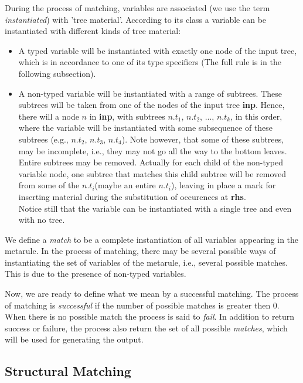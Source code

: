 During the process of matching, variables are associated 
(we use the term {\it instantiated}) with 'tree material'.
According to its class a variable can be instantiated with different kinds of
tree material:

\begin{itemize}
\item	A typed variable will be instantiated with exactly one node of
	the input tree, which is in accordance to one of its type specifiers
	(The full rule is in the following subsection). 

\item	A non-typed variable will be instantiated with a range of subtrees.
	These subtrees will be taken from one of the nodes of the input tree
	{\bf inp}. Hence, there will a node $n$ in {\bf inp}, with subtrees
	$n.t_1$, $n.t_2$, ..., $n.t_k$, in this order, where the variable
	will be instantiated with some subsequence of these subtrees 
	(e.g., $n.t_2$, $n.t_3$, $n.t_4$). Note however, that some of these
	subtrees, may be incomplete, i.e., they may not go all the way to the 
	bottom leaves. Entire subtrees may be removed. Actually for each
	child of the non-typed variable node, one subtree that matches this
	child subtree will be removed from some of the $n.t_i$(maybe an entire
	$n.t_i$), leaving in place a mark for inserting material during the
	substitution of occurences at {\bf rhs}.\\
	Notice still that the variable can
	be instantiated with a single tree and even with no tree. 

\end{itemize} 

We define a {\it match} to be a complete instantiation of all variables 
appearing in the metarule. In the process of matching, there may be several
possible ways of instantiating the set of variables of the metarule, i.e.,
several possible matches. This is due to the presence of non-typed variables.

Now, we are ready to define what we mean by a successful matching. The process
of matching is {\it successful} 
if the number of possible matches is greater then 0.
When there is no possible match the process is said to {\it fail}.
In addition to return success or failure, the process also return the set of
all possible {\it matches}, which will be used for generating the output.

\subsection{Structural Matching}

